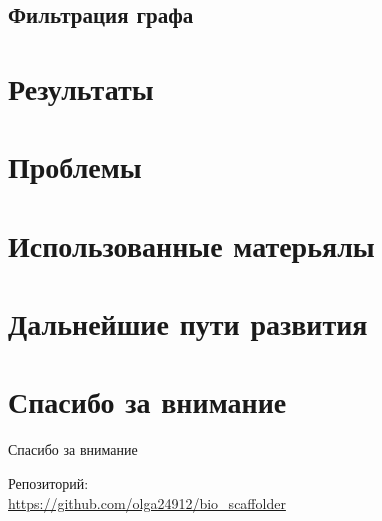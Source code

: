 \documentclass{beamer}
\begin{document}
\subsection{Фильтрация графа}

\section{Результаты}

\section{Проблемы}

\section{Использованные матерьялы}

\section{Дальнейшие пути развития}

\section{Спасибо за внимание}
\begin{frame}{Спасибо за внимание}
    \begin{center}
        Репозиторий: \\ \url{https://github.com/olga24912/bio_scaffolder}
    \end{center}
\end{frame}
\end{document}
